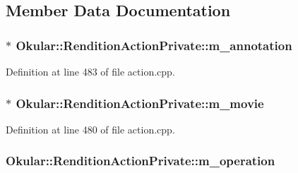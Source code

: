 \subsection{Member Data Documentation}
\hypertarget{classOkular_1_1RenditionActionPrivate_a6fc33bd8ab51d42adc20eeed334bb159}{
\subsubsection[{m\+\_\+annotation}]{$\ast$ Okular\+::\+Rendition\+Action\+Private\+::m\+\_\+annotation}}\label{classOkular_1_1RenditionActionPrivate_a6fc33bd8ab51d42adc20eeed334bb159}


Definition at line 483 of file action.\+cpp.

\hypertarget{classOkular_1_1RenditionActionPrivate_ac2021ae7a38f8aa5a7f2f07b6239910b}{
\subsubsection[{m\+\_\+movie}]{$\ast$ Okular\+::\+Rendition\+Action\+Private\+::m\+\_\+movie}}\label{classOkular_1_1RenditionActionPrivate_ac2021ae7a38f8aa5a7f2f07b6239910b}


Definition at line 480 of file action.\+cpp.

\hypertarget{classOkular_1_1RenditionActionPrivate_a972d966b5a17b9ba40576e16d07b3ae1}{
\subsubsection[{m\+\_\+operation}]{ Okular\+::\+Rendition\+Action\+Private\+::m\+\_\+operation}}\label{classOkular_1_1RenditionActionPrivate_a972d966b5a17b9ba40576e16d07b3ae1}


